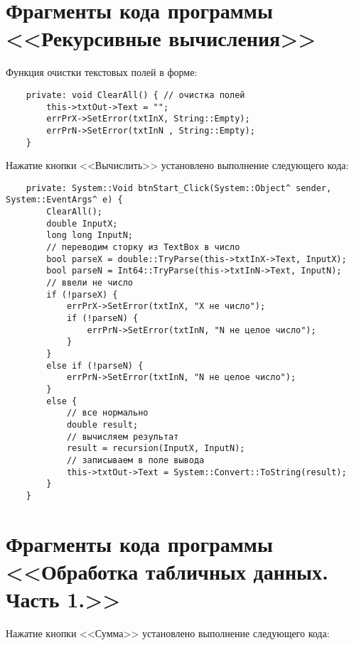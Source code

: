 \section{Фрагменты кода программы <<Рекурсивные вычисления>>}\label{app:task3}

Функция очистки текстовых полей в форме:

\begin{verbatim}
	private: void ClearAll() { // очистка полей
		this->txtOut->Text = "";
		errPrX->SetError(txtInX, String::Empty);
		errPrN->SetError(txtInN , String::Empty);
	}
\end{verbatim}

Нажатие кнопки <<Вычислить>> установлено выполнение следующего кода:

\begin{verbatim}
	private: System::Void btnStart_Click(System::Object^ sender, System::EventArgs^ e) {
		ClearAll();
		double InputX;
		long long InputN;
		// переводим сторку из TextBox в число
		bool parseX = double::TryParse(this->txtInX->Text, InputX);
		bool parseN = Int64::TryParse(this->txtInN->Text, InputN);
		// ввели не число
		if (!parseX) {
			errPrX->SetError(txtInX, "X не число");
			if (!parseN) {
				errPrN->SetError(txtInN, "N не целое число");
			}
		}
		else if (!parseN) {
			errPrN->SetError(txtInN, "N не целое число");
		}
		else {
			// все нормально 
			double result;
			// вычисляем результат
			result = recursion(InputX, InputN);
			// записываем в поле вывода
			this->txtOut->Text = System::Convert::ToString(result);
		}
	}
\end{verbatim}

\section{Фрагменты кода программы <<Обработка табличных данных. Часть 1.>>}\label{app:task4}

Нажатие кнопки <<Сумма>> установлено выполнение следующего кода:


